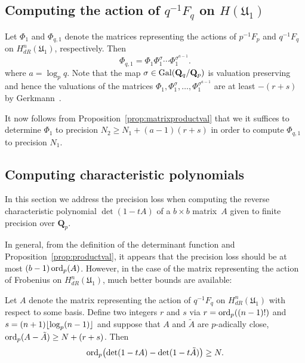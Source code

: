\subsection{Computing the action of $q^{-1} F_q$ on $H(\mathfrak{U}_1)$}

Let $\Phi_1$ and $\Phi_{q,1}$ denote the matrices representing the 
actions of $p^{-1} F_p$ and $q^{-1} F_q$ on $H_{dR}^{n}(\mathfrak{U}_1)$, 
respectively.  Then 
\begin{equation*}
\Phi_{q,1} = \Phi_1 \Phi_1^{\sigma} \dotsm \Phi_1^{\sigma^{a-1}}.
\end{equation*}
where $a = \log_p q$.  Note that the map 
$\sigma \in \operatorname{Gal}(\mathbf{Q}_q / \mathbf{Q}_p)$ is valuation preserving 
and hence the valuations of the matrices 
$\Phi_1, \Phi_1^{\sigma}, \dotsc, \Phi_1^{\sigma^{a-1}}$ are at least 
$-(r+s)$ by Gerkmann~\citep[Lemma~3.3]{Gerkmann2007}.

It now follows from Proposition~\ref{prop:matrixproductval} that 
we it suffices to determine $\Phi_1$ to precision $N_2 \geq N_1 + (a-1) (r+s)$ 
in order to compute $\Phi_{q,1}$ to precision $N_1$.

\subsection{Computing characteristic polynomials}

In this section we address the precision loss when computing the reverse 
characteristic polynomial $\det(1 - t A)$ of a $b \times b$ matrix~$A$ 
given to finite precision over $\mathbf{Q}_p$.

In general, from the definition of the determinant function and 
Proposition~\ref{prop:productval}, it appears that the precision 
loss should be at most $(b-1) \operatorname{ord}_p(A)$.  However, in the case 
of the matrix representing the action of Frobenius 
on $H_{dR}^n(\mathfrak{U}_1)$, much better bounds are available:

\begin{lem} \label{lem:charpoly}
Let $A$ denote the matrix representing the action of $q^{-1} F_q$ 
on $H_{dR}^{n}(\mathfrak{U}_1)$ with respect to some basis.  Define 
two integers $r$ and $s$ via \mbox{$r = \operatorname{ord}_p((n-1)!)$} and 
\mbox{$s = (n + 1) \lfloor\log_p (n-1)\rfloor$} and suppose that 
$A$ and $\tilde{A}$ are $p$-adically close, $\operatorname{ord}_p(A-\tilde{A}) \geq N + (r + s)$.  
Then 
\begin{equation*}
\operatorname{ord}_p \bigl( \det(1 - t A) - \det(1 - t \tilde{A}) \bigr) \geq N.
\end{equation*}
\end{lem}

